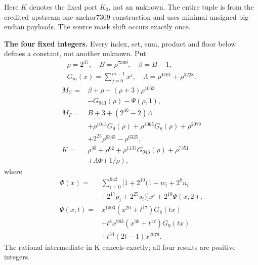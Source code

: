 \begingroup
\providecommand{\fl}[1]{\left\lfloor#1\right\rfloor}
\providecommand{\rg}[2]{\{#1,\ldots,#2\}}
Here $K$ denotes the fixed port $K_0$, not an unknown. The entire tuple is
from the credited upstream one-anchor7309 construction and uses minimal
unsigned big-endian payloads. The source mask shift occurs exactly once.

\textbf{The four fixed integers.}
Every index, set, sum, product and floor below defines a constant, not
another unknown. Put
\[
\begin{gathered}
\rho=2^{47},\quad B=\rho^{7309},\quad\beta=B-1,\\
G_m(x)=\sum_{j=0}^{m-1}x^j,\quad
\Lambda=\rho^{4161}+\rho^{5228}.
\end{gathered}
\]
\begin{align*}
M_C={}&\beta+\rho-(\rho+3)\rho^{1063}\\
&-G_{943}(\rho)-\Psi(\rho,1),\\
M_F={}&B+3+(2^{46}-2)\Lambda\\
&+\rho^{1013}G_9(\rho)+\rho^{1065}G_8(\rho)
  +\rho^{2079}\\
&+2^{25}\rho^{6343}-\rho^{6325},\\
K={}&\rho^{30}+\rho^{62}+\rho^{1137}G_{943}(\rho)+\rho^{7351}\\
&+\Lambda\Phi(1/\rho),
\end{align*}
where
\[
\begin{split}
\Phi(x)={}&\sum_{i=0}^{942}[1+2^{10}(1+w_i+2^8n_i\\
&+2^{17}p_i+2^{25}s_i)]x^i+2^{10}\Psi(x,2),\\
\Psi(x,t)={}&x^{1003}(x^{20}+t^{17})G_8(tx)\\
&+t^8x^{983}(x^{30}+t^{17})G_9(tx)\\
&+t^{34}(2t-1)x^{2079}.
\end{split}
\]
The rational intermediate in K cancels exactly; all four results are positive integers.

